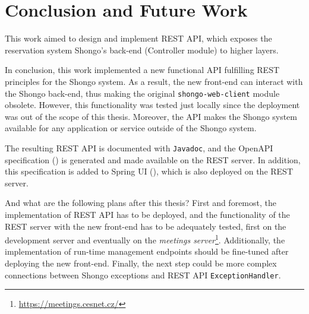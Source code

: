 \chapter{Conclusion and Future Work} \label{cha:conclusion}
This work aimed to design and implement REST API, which exposes the reservation system Shongo's back-end (Controller module) to higher layers.

In conclusion, this work implemented a new functional API fulfilling REST principles for the Shongo system.
As a result, the new front-end \cite{drobnakm} can interact with the Shongo back-end, thus making the original \texttt{shongo-web-client} module obsolete. However, this functionality was tested just locally since the deployment was out of the scope of this thesis.
Moreover, the API makes the Shongo system available for any application or service outside of the Shongo system.

The resulting REST API is documented with \texttt{Javadoc}, and the OpenAPI specification () is generated and made available on the REST server.
In addition, this specification is added to Spring UI (), which is also deployed on the REST server.

And what are the following plans after this thesis?
First and foremost, the implementation of REST API has to be deployed, and the functionality of the REST server with the new front-end has to be adequately tested, first on the development server and eventually on the \emph{meetings server}\footnote{\url{https://meetings.cesnet.cz/}}.
Additionally, the implementation of run-time management endpoints should be fine-tuned after deploying the new front-end.
Finally, the next step could be more complex connections between Shongo exceptions and REST API \texttt{ExceptionHandler}.
